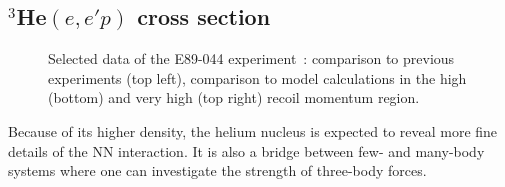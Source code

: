 \documentclass{elsart}
\begin{document}
\subsection{$^3$He$(e,e'p)$ cross section}
\label{sec:2bbu}

\begin{figure}[htb]

\vspace*{-220pt}


\vspace*{-60pt}

\begin{center}
\vspace*{-60pt}
\caption{Selected data of the E89-044 experiment~\cite{Rva04}: comparison to
previous experiments (top left), comparison to model calculations in the high
(bottom) and very high (top right) recoil momentum region.}
\label{marat}
\end{center}
\end{figure}

Because of its higher density, the helium nucleus is expected to reveal more 
fine details of the NN interaction. It is also a bridge between few- and 
many-body systems where one can investigate the strength of three-body forces. 
\end{document}
